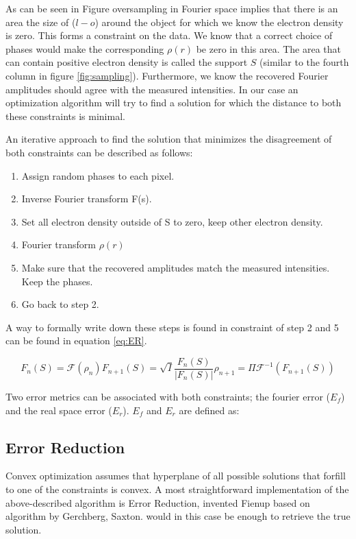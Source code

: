As can be seen in Figure oversampling in Fourier space implies that there is an area the size of ($l-o$) around the object for which we know the electron density is zero. This forms a constraint on the data. We know that a correct choice of phases would make the corresponding $\rho(r)$ be zero in this area. The area that can contain positive electron density is called the support $S$ (similar to the fourth column in figure \ref{fig:sampling}). Furthermore, we know the recovered Fourier amplitudes should agree with the measured intensities. In our case an optimization algorithm will try to find a solution for which the distance to both these constraints is minimal. 

An iterative approach to find the solution that minimizes the disagreement of both constraints can be
described as follows:\\


\begin{enumerate}
\item Assign random phases to each pixel.
\item Inverse Fourier transform F(s).
\item Set all electron density outside of S to zero, keep other electron density.
\item Fourier transform $\rho(r)$
\item Make sure that the recovered amplitudes match the measured intensities. Keep the phases.
\item Go back to step 2.
\end{enumerate}

A way to formally write down these steps is found in  constraint of step 2 and 5 can be found in equation \ref{eq:ER}.

\begin{equation}\label{eq:ER}
F_{n}(S) = \mathcal{F}(\rho_n)
F_{n+1}(S) = \sqrt{I}\frac{F_{n}(S)}{|F_n(S)|}
\rho_{n+1} = \Pi \mathcal{F^{-1}}(F_{n+1}(S))
\end{equation}

Two error metrics can be associated with both constraints; the fourier error ($E_f$) and the real space error ($E_r$). $E_f$ and $E_r$ are defined as:


\subsection{Error Reduction}
Convex optimization assumes that hyperplane of all possible solutions that forfill to one of the constraints is convex. A most straightforward implementation of the above-described algorithm is Error Reduction, invented Fienup based on algorithm by Gerchberg, Saxton. would in this case be enough to retrieve the true solution.  

